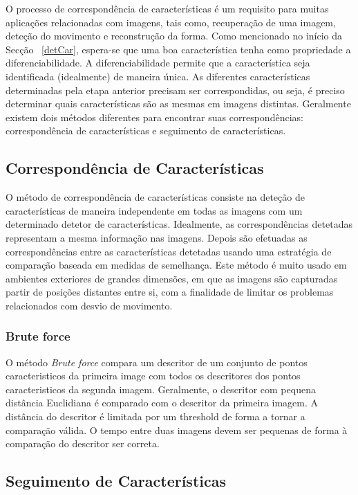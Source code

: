 O processo de correspondência de características é um requisito para muitas aplicações relacionadas com imagens, tais como, recuperação de uma imagem, deteção do movimento e reconstrução da forma. 
Como mencionado no início da Secção ~\ref{detCar}, espera-se que uma boa característica tenha como propriedade a diferenciabilidade. A diferenciabilidade permite que a característica seja identificada (idealmente) de maneira única.
As diferentes características determinadas pela etapa anterior precisam ser correspondidas, ou seja, é preciso determinar quais características são as mesmas em imagens distintas. Geralmente existem dois métodos diferentes para encontrar suas correspondências: correspondência de características e seguimento de características. 


\subsection{Correspondência de Características}

O método de correspondência de características consiste na deteção de características de maneira independente em todas as imagens com um determinado detetor de características.
Idealmente, as correspondências detetadas representam a mesma informação nas imagens.
Depois são efetuadas as correspondências entre as características detetadas usando uma estratégia de comparação baseada em medidas de semelhança.
Este método é muito usado em ambientes exteriores de grandes dimensões, em que as imagens são capturadas partir de posições distantes entre si, com a finalidade de limitar os problemas relacionados com desvio de movimento.

\subsubsection{Brute force}\label{subchap:BRUTE}

O método \textit{Brute force} compara um descritor de um conjunto de pontos caracteristicos da primeira image com todos os descritores dos pontos caracteristicos da segunda imagem. Geralmente, o descritor com pequena distância Euclidiana é comparado com o descritor da primeira imagem. A distância do descritor é limitada por um threshold de forma a tornar a comparação válida. O tempo entre duas imagens devem ser pequenas de forma à comparação do descritor ser correta.


\subsection{Seguimento de Características}


